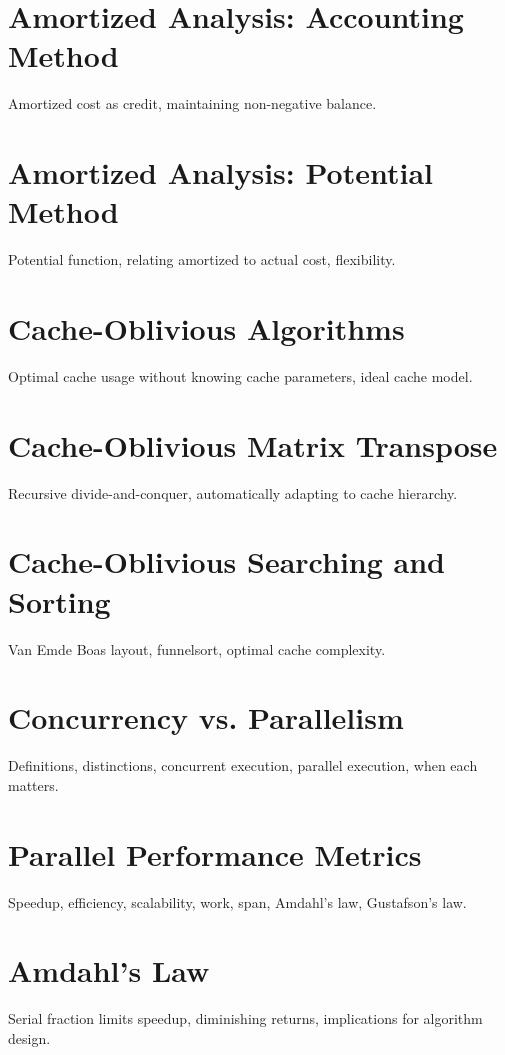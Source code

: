 \chapter{Amortized Analysis: Accounting Method}
Amortized cost as credit, maintaining non-negative balance.

\chapter{Amortized Analysis: Potential Method}
Potential function, relating amortized to actual cost, flexibility.

\chapter{Cache-Oblivious Algorithms}
Optimal cache usage without knowing cache parameters, ideal cache model.

\chapter{Cache-Oblivious Matrix Transpose}
Recursive divide-and-conquer, automatically adapting to cache hierarchy.

\chapter{Cache-Oblivious Searching and Sorting}
Van Emde Boas layout, funnelsort, optimal cache complexity.


\chapter{Concurrency vs. Parallelism}
Definitions, distinctions, concurrent execution, parallel execution, when each matters.

\chapter{Parallel Performance Metrics}
Speedup, efficiency, scalability, work, span, Amdahl's law, Gustafson's law.

\chapter{Amdahl's Law}
Serial fraction limits speedup, diminishing returns, implications for algorithm design.

